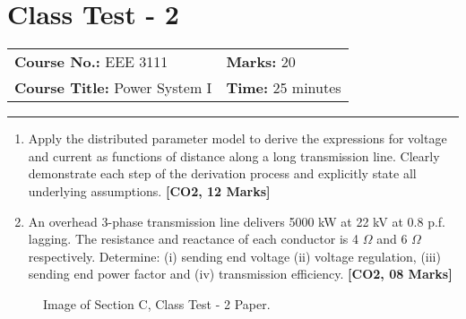 \documentclass[12pt, a4paper]{article}
\begin{document}
	\section{Class Test - 2}
	\begin{tabular}{ll}
		\textbf{Course No.:} EEE 3111 & \textbf{Marks:} 20 \\
		\textbf{Course Title:} Power System I & \textbf{Time:} 25 minutes \\
	\end{tabular}
	\hrule
	\vspace{0.5cm}
	\begin{enumerate}[label=\textbf{\arabic*.}]
		\item Apply the distributed parameter model to derive the expressions for voltage and current as functions of distance along a long transmission line. Clearly demonstrate each step of the derivation process and explicitly state all underlying assumptions. \hfill \textbf{[CO2, 12 Marks]}
		\item An overhead 3-phase transmission line delivers 5000 kW at 22 kV at 0.8 p.f. lagging. The resistance and reactance of each conductor is 4 $\Omega$ and 6 $\Omega$ respectively. Determine: (i) sending end voltage (ii) voltage regulation, (iii) sending end power factor and (iv) transmission efficiency. \hfill \textbf{[CO2, 08 Marks]}
	\end{enumerate}
	\begin{figure}[h!]
		\centering
		\caption{Image of Section C, Class Test - 2 Paper.}
	\end{figure}
	
	\newpage
\end{document}
